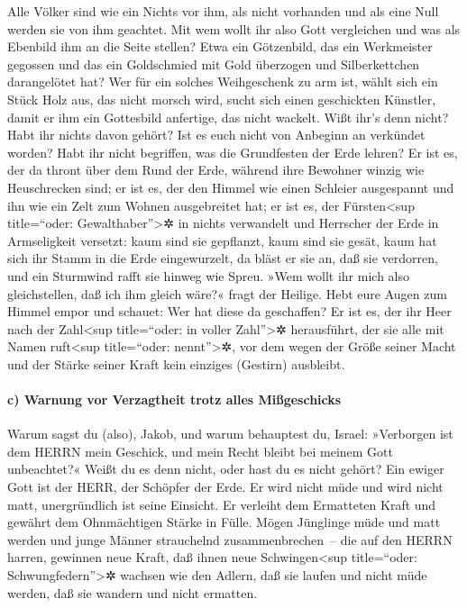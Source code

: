 Alle Völker sind wie ein Nichts vor ihm, als nicht
vorhanden und als eine Null werden sie von ihm geachtet.
Mit wem wollt ihr also Gott vergleichen und was als
Ebenbild ihm an die Seite stellen? Etwa ein Götzenbild,
das ein Werkmeister gegossen und das ein Goldschmied mit Gold überzogen
und Silberkettchen darangelötet hat? Wer für ein solches
Weihgeschenk zu arm ist, wählt sich ein Stück Holz aus, das nicht morsch
wird, sucht sich einen geschickten Künstler, damit er ihm ein Gottesbild
anfertige, das nicht wackelt. Wißt ihr's denn nicht? Habt
ihr nichts davon gehört? Ist es euch nicht von Anbeginn an verkündet
worden? Habt ihr nicht begriffen, was die Grundfesten der Erde lehren?
Er ist es, der da thront über dem Rund der Erde, während
ihre Bewohner winzig wie Heuschrecken sind; er ist es, der den Himmel
wie einen Schleier ausgespannt und ihn wie ein Zelt zum Wohnen
ausgebreitet hat; er ist es, der Fürsten\textless sup
title=``oder: Gewalthaber''\textgreater✲ in nichts verwandelt und
Herrscher der Erde in Armseligkeit versetzt: kaum sind
sie gepflanzt, kaum sind sie gesät, kaum hat sich ihr Stamm in die Erde
eingewurzelt, da bläst er sie an, daß sie verdorren, und ein Sturmwind
rafft sie hinweg wie Spreu. »Wem wollt ihr mich also
gleichstellen, daß ich ihm gleich wäre?« fragt der Heilige.
Hebt eure Augen zum Himmel empor und schauet: Wer hat
diese da geschaffen? Er ist es, der ihr Heer nach der Zahl\textless sup
title=``oder: in voller Zahl''\textgreater✲ herausführt, der sie alle
mit Namen ruft\textless sup title=``oder: nennt''\textgreater✲, vor dem
wegen der Größe seiner Macht und der Stärke seiner Kraft kein einziges
(Gestirn) ausbleibt.

\hypertarget{c-warnung-vor-verzagtheit-trotz-alles-miuxdfgeschicks}{%
\paragraph{c) Warnung vor Verzagtheit trotz alles
Mißgeschicks}\label{c-warnung-vor-verzagtheit-trotz-alles-miuxdfgeschicks}}

Warum sagst du (also), Jakob, und warum behauptest du,
Israel: »Verborgen ist dem HERRN mein Geschick, und mein Recht bleibt
bei meinem Gott unbeachtet?« Weißt du es denn nicht, oder
hast du es nicht gehört? Ein ewiger Gott ist der HERR, der Schöpfer der
Erde. Er wird nicht müde und wird nicht matt, unergründlich ist seine
Einsicht. Er verleiht dem Ermatteten Kraft und gewährt
dem Ohnmächtigen Stärke in Fülle. Mögen Jünglinge müde
und matt werden und junge Männer strauchelnd zusammenbrechen~--
die auf den HERRN harren, gewinnen neue Kraft, daß ihnen
neue Schwingen\textless sup title=``oder: Schwungfedern''\textgreater✲
wachsen wie den Adlern, daß sie laufen und nicht müde werden, daß sie
wandern und nicht ermatten.

